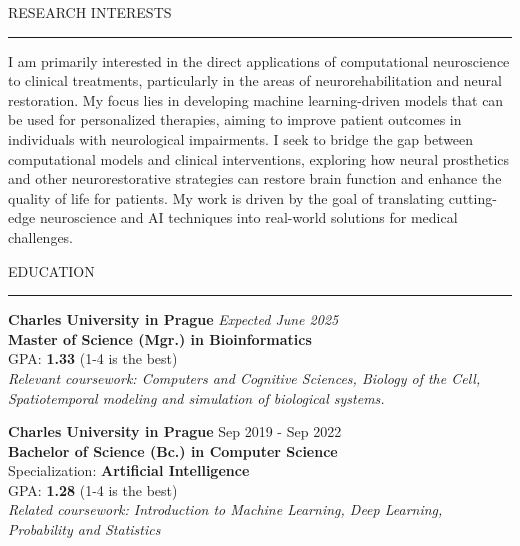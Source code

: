 \documentclass{resume} %
\renewenvironment{rSection}[1]{
\sectionskip
\textcolor{CarnegieMellonRed}{\MakeUppercase{#1}}
\sectionlineskip
\hrule
\begin{list}{}{
\setlength{\leftmargin}{1.5em}
}
\item[]
}{
\end{list}
}
\begin{document}
\begin{rSection}{Research Interests}
    I am primarily interested in the direct applications of computational 
    neuroscience to clinical treatments, particularly in the areas of 
    neurorehabilitation and neural restoration. My focus lies in developing 
    machine learning-driven models that can be used for personalized therapies, 
    aiming to improve patient outcomes in individuals with neurological impairments. 
    I seek to bridge the gap between computational models and clinical interventions, 
    exploring how neural prosthetics and other neurorestorative strategies can 
    restore brain function and enhance the quality of life for patients. 
    My work is driven by the goal of translating cutting-edge neuroscience and 
    AI techniques into real-world solutions for medical challenges.
\end{rSection}

\begin{rSection}{Education}
{\bf \large Charles University in Prague} \hfill {\em Expected June 2025} 
\\ {\bf Master of Science (Mgr.) in Bioinformatics} \hfill
\\ GPA: \textbf{1.33} (1-4 \vline {} is the best)  \hfill
\\ \textit{Relevant coursework: Computers and Cognitive Sciences, Biology of the Cell, 
Spatiotemporal modeling and simulation of biological systems.
}

{\bf \large Charles University in Prague} \hfill {Sep 2019 - Sep 2022} 
\\ {\bf Bachelor of Science (Bc.) in Computer Science} \hfill
\\ Specialization: \textbf{Artificial Intelligence} \hfill
\\ GPA: \textbf{1.28} (1-4 \vline {} is the best)  \hfill
\\ \textit{Related coursework: Introduction to Machine Learning, Deep Learning, 
Probability and Statistics
}

\end{rSection}
\end{document}

